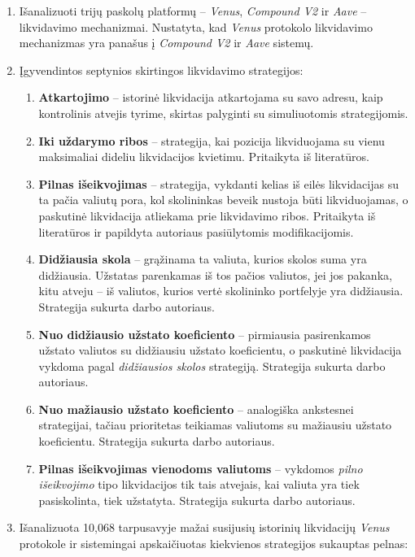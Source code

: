 \documentclass[]{VUMIFTemplateClass}
\begin{document}
\begin{enumerate}
\item Išanalizuoti trijų paskolų platformų – \textit{Venus}, \textit{Compound V2} ir \textit{Aave} – likvidavimo mechanizmai. Nustatyta, kad \textit{Venus} protokolo likvidavimo mechanizmas yra panašus į \textit{Compound V2} ir \textit{Aave} sistemų.
\item Įgyvendintos septynios skirtingos likvidavimo strategijos:
  \begin{enumerate}
  \item \textbf{Atkartojimo} – istorinė likvidacija atkartojama su savo adresu, kaip kontrolinis atvejis tyrime, skirtas palyginti su simuliuotomis strategijomis.
  \item \textbf{Iki uždarymo ribos} – strategija, kai pozicija likviduojama su vienu maksimaliai dideliu likvidacijos kvietimu. Pritaikyta iš literatūros.
  \item \textbf{Pilnas išeikvojimas} – strategija, vykdanti kelias iš eilės likvidacijas su ta pačia valiutų pora, kol skolininkas beveik nustoja būti likviduojamas, o paskutinė likvidacija atliekama prie likvidavimo ribos. Pritaikyta iš literatūros ir papildyta autoriaus pasiūlytomis modifikacijomis.
  \item \textbf{Didžiausia skola} – grąžinama ta valiuta, kurios skolos suma yra didžiausia. Užstatas parenkamas iš tos pačios valiutos, jei jos pakanka, kitu atveju – iš valiutos, kurios vertė skolininko portfelyje yra didžiausia. Strategija sukurta darbo autoriaus.
  \item \textbf{Nuo didžiausio užstato koeficiento} – pirmiausia pasirenkamos užstato valiutos su didžiausiu užstato koeficientu, o paskutinė likvidacija vykdoma pagal \textit{didžiausios skolos} strategiją. Strategija sukurta darbo autoriaus.
  \item \textbf{Nuo mažiausio užstato koeficiento} – analogiška ankstesnei strategijai, tačiau prioritetas teikiamas valiutoms su mažiausiu užstato koeficientu. Strategija sukurta darbo autoriaus.
  \item \textbf{Pilnas išeikvojimas vienodoms valiutoms} – vykdomos \textit{pilno išeikvojimo} tipo likvidacijos tik tais atvejais, kai valiuta yra tiek pasiskolinta, tiek užstatyta. Strategija sukurta darbo autoriaus.
  \end{enumerate}
\item Išanalizuota 10,068 tarpusavyje mažai susijusių istorinių likvidacijų \textit{Venus} protokole ir sistemingai apskaičiuotas kiekvienos strategijos sukauptas pelnas:

\end{enumerate}
\end{document}
